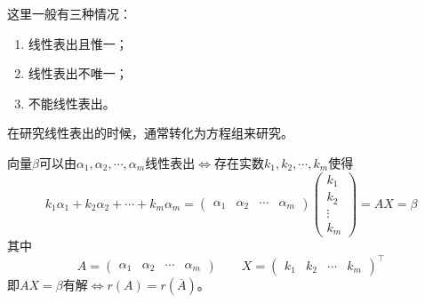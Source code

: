 这里一般有三种情况：
\begin{enumerate}[(1)]
    \item 线性表出且惟一；
    \item 线性表出不唯一；
    \item 不能线性表出。
\end{enumerate}
在研究线性表出的时候，通常转化为方程组来研究。
\begin{theorem}
    向量$\beta$可以由$\alpha_1,\alpha_2,\cdots,\alpha_m$线性表出$\iff$存在实数$k_1,k_2,\cdots,k_m$使得
    \[
        k_1\alpha_1 + k_2\alpha_2 +\cdots + k_m\alpha_m =
        \begin{pmatrix}
            \alpha_1 & \alpha_2 & \cdots & \alpha_m
        \end{pmatrix}
        \begin{pmatrix}
            k_1 \\k_2\\\vdots\\k_m
        \end{pmatrix}
        =AX=
        \beta
    \]
    其中
    \[
        A =
        \begin{pmatrix}
            \alpha_1 & \alpha_2 & \cdots & \alpha_m
        \end{pmatrix}
        \qquad
        X =
        \begin{pmatrix}
            k_1 & k_2 & \cdots & k_m
        \end{pmatrix}^\intercal
    \]
    即$AX=\beta$有解$\iff r(A)=r(\overline{A})$。
\end{theorem}

